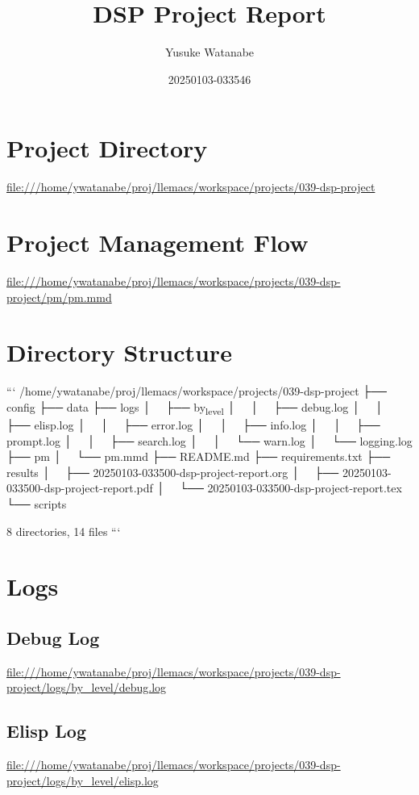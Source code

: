 \documentclass[11pt]{article}
\author{Yusuke Watanabe}
\date{20250103-033546}
\title{DSP Project Report}
\begin{document}
\maketitle
\tableofcontents


\section{Project Directory}
\label{sec:orgb4bcedd}
\url{file:///home/ywatanabe/proj/llemacs/workspace/projects/039-dsp-project}

\section{Project Management Flow}
\label{sec:org08c9f96}
\url{file:///home/ywatanabe/proj/llemacs/workspace/projects/039-dsp-project/pm/pm.mmd}

\section{Directory Structure}
\label{sec:org4febe46}
```
/home/ywatanabe/proj/llemacs/workspace/projects/039-dsp-project
├── config
├── data
├── logs
│   ├── by\textsubscript{level}
│   │   ├── debug.log
│   │   ├── elisp.log
│   │   ├── error.log
│   │   ├── info.log
│   │   ├── prompt.log
│   │   ├── search.log
│   │   └── warn.log
│   └── logging.log
├── pm
│   └── pm.mmd
├── README.md
├── requirements.txt
├── results
│   ├── 20250103-033500-dsp-project-report.org
│   ├── 20250103-033500-dsp-project-report.pdf
│   └── 20250103-033500-dsp-project-report.tex
└── scripts

8 directories, 14 files
```

\section{Logs}
\label{sec:org1f602da}
\subsection{Debug Log}
\label{sec:org68e3cbd}
\url{file:///home/ywatanabe/proj/llemacs/workspace/projects/039-dsp-project/logs/by\_level/debug.log}

\subsection{Elisp Log}
\label{sec:orgad7c394}
\url{file:///home/ywatanabe/proj/llemacs/workspace/projects/039-dsp-project/logs/by\_level/elisp.log}
\end{document}
